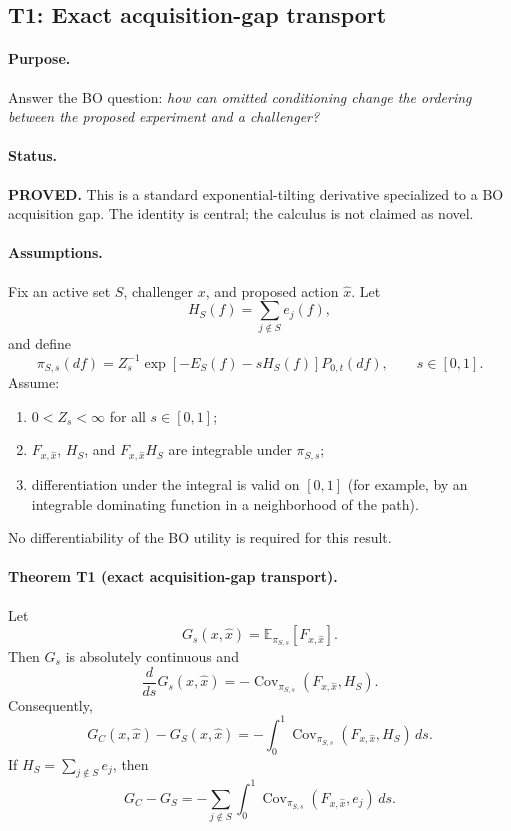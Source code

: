 \subsection{T1: Exact acquisition-gap transport}

\paragraph{Purpose.}
Answer the BO question: \emph{how can omitted conditioning change the ordering
between the proposed experiment and a challenger?}

\paragraph{Status.}
\textbf{PROVED.}  This is a standard exponential-tilting derivative specialized
to a BO acquisition gap.  The identity is central; the calculus is not claimed
as novel.

\paragraph{Assumptions.}
Fix an active set $S$, challenger $x$, and proposed action $\widehat x$.  Let
\[
    H_S(f)=\sum_{j\notin S}e_j(f),
\]
and define
\[
    \pi_{S,s}(df)
    = Z_s^{-1}\exp[-E_S(f)-sH_S(f)]P_{0,t}(df),
    \qquad s\in[0,1].
\]
Assume:
\begin{enumerate}
    \item $0<Z_s<\infty$ for all $s\in[0,1]$;
    \item $F_{x,\widehat x}$, $H_S$, and
          $F_{x,\widehat x}H_S$ are integrable under $\pi_{S,s}$;
    \item differentiation under the integral is valid on $[0,1]$ (for example,
          by an integrable dominating function in a neighborhood of the path).
\end{enumerate}
No differentiability of the BO utility is required for this result.

\paragraph{Theorem T1 (exact acquisition-gap transport).}
Let
\[
    G_s(x,\widehat x)
    =\mathbb E_{\pi_{S,s}}[F_{x,\widehat x}].
\]
Then $G_s$ is absolutely continuous and
\begin{equation}
    \frac{d}{ds}G_s(x,\widehat x)
    =
    -\operatorname{Cov}_{\pi_{S,s}}
       \!\left(F_{x,\widehat x},H_S\right).
    \label{eq:T1-derivative}
\end{equation}
Consequently,
\begin{equation}
    G_C(x,\widehat x)-G_S(x,\widehat x)
    =
    -\int_0^1
      \operatorname{Cov}_{\pi_{S,s}}
      \!\left(F_{x,\widehat x},H_S\right)\,ds.
    \label{eq:T1-integrated}
\end{equation}
If $H_S=\sum_{j\notin S}e_j$, then
\begin{equation}
    G_C-G_S
    =
    -\sum_{j\notin S}\int_0^1
      \operatorname{Cov}_{\pi_{S,s}}
      \!\left(F_{x,\widehat x},e_j\right)\,ds.
    \label{eq:T1-factorized}
\end{equation}

